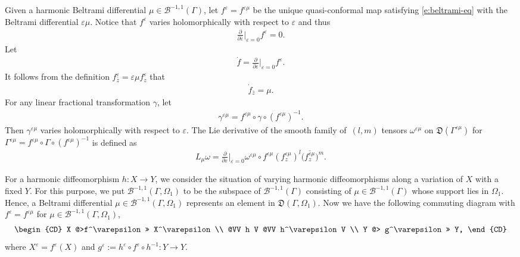 \documentclass[10pt,a4paper]{amsart}
\numberwithin{equation}{section}
\newcommand{\pa}{\partial}
\newcommand{\vep}{\varepsilon}
\begin{document}
Given a harmonic Beltrami differential $\mu\in \mathcal{B}^{-1,1}(\Gamma)$,
let $f^\vep=f^{\vep\mu}$ be the unique quasi-conformal map satisfying \eqref{e:beltrami-eq} with the Beltrami differential $\vep\mu$.
Notice that $f^{\vep}$ varies holomorphically with respect to $\vep$ and thus
\begin{gather*}
\frac{\pa}{\pa\bar{\vep}} \bigg|_{\vep=0}f^{\vep}=0.
\end{gather*}
Let
\begin{gather*}
\dot{f}= \frac{\pa}{\pa\vep}\bigg|_{\vep=0}f^{\vep}.
\end{gather*}
It follows from the definition $f^{\vep}_{\bar{z}}=\vep\mu f^{\vep}_z$ that
\begin{gather*}
\dot{f}_{\bar{z}}=\mu.
\end{gather*}
For any linear fractional transformation $\gamma$, let
\begin{gather*}
\gamma^{\vep\mu}=f^{\vep\mu}\circ\gamma\circ (f^{\vep\mu})^{-1}.
\end{gather*}
Then $\gamma^{\vep\mu}$ varies holomorphically with respect to $\vep$.
The Lie derivative of the smooth family of~$(l, m)$ tensors $\omega^{\vep\mu}$ on $\mathfrak{D}(\Gamma^{\vep\mu})$ for $\Gamma^{\vep\mu}= f^{\vep\mu}\circ\Gamma\circ (f^{\vep\mu})^{-1}$ is defined as
\begin{gather*}
L_{\mu}\omega=\frac{\pa}{\pa\vep}\bigg|_{\vep=0}\omega^{\vep\mu}\circ f^{\vep\mu} (f^{\vep\mu}_z)^l\big(\overline{f^{\vep\mu}_z}\big)^m.
\end{gather*}

For a harmonic diffeomorphism $h\colon X\to Y$, we consider the situation of varying harmonic diffeomorphisms along a variation of $X$ with a fixed $Y$.
For this purpose, we put $\mathcal{B}^{-1,1}(\Gamma,\Omega_1)$ to be the subspace of
$\mathcal{B}^{-1,1}(\Gamma)$ consisting of $\mu\in \mathcal{B}^{-1,1}(\Gamma)$ whose support lies in $\Omega_1$. Hence, a Beltrami differential $\mu\in\mathcal{B}^{-1,1}(\Gamma,\Omega_1)$ represents an element in $\mathfrak{D}(\Gamma,\Omega_1)$.
Now we have the following commuting diagram with $f^\vep=f^{\vep\mu}$ for $\mu\in\mathcal{B}^{-1,1}(\Gamma,\Omega_1)$,
\begin{gather*}%
\begin{CD}
 X @>f^\vep >> X^\vep \\
 @VV h V @VV h^\vep V \\
 Y @> g^\vep>> Y,
\end{CD}
\end{gather*}
where $X^\vep= f^\vep(X)$ and $g^\vep:= h^\vep\circ f^\vep\circ h^{-1}\colon Y\to Y$.
\end{document}
